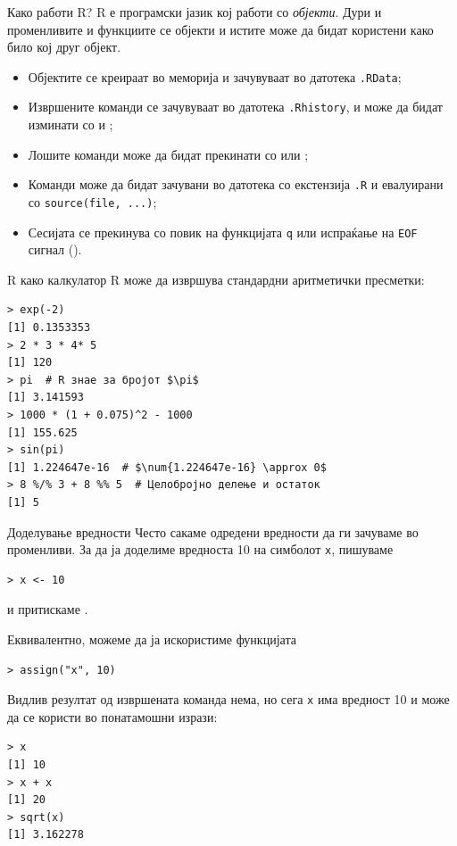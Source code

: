 \documentclass[hyperref={unicode}, xcolor={svgnames, table},
usepdftitle=false]{beamer}
\theoremstyle{remark}
\begin{document}
\begin{frame}{Како работи R?}
  R е програмски јазик кој работи со \emph{објекти}.  Дури и променливите и
  функциите се објекти и истите може да бидат користени како било кој друг
  објект.
  \begin{itemize}
  \item Објектите се креираат во меморија и зачувуваат во датотека
    \texttt{.RData};
  \item Извршените команди се зачувуваат во датотека \texttt{.Rhistory}, и може
    да бидат изминати со \keys{\arrowkeyup} и \keys{\arrowkeydown};
  \item Лошите команди може да бидат прекинати со \keys{\esc} или
    ;
  \item Команди може да бидат зачувани во датотека со екстензија \texttt{.R} и
    евалуирани со \texttt{source(file, ...)};
  \item Сесијата се прекинува со повик на функцијата \texttt{q} или
    испраќање на \texttt{EOF} сигнал ().
  \end{itemize}
\end{frame}

\begin{frame}[fragile]{R како калкулатор}
  R може да извршува стандардни аритметички пресметки:
\begin{verbatim}
> exp(-2)
[1] 0.1353353
> 2 * 3 * 4* 5
[1] 120
> pi  # R знае за бројот $\pi$
[1] 3.141593
> 1000 * (1 + 0.075)^2 - 1000
[1] 155.625
> sin(pi)
[1] 1.224647e-16  # $\num{1.224647e-16} \approx 0$
> 8 %/% 3 + 8 %% 5  # Целобројно делење и остаток
[1] 5
\end{verbatim}
\end{frame}

\begin{frame}[fragile]{Доделување вредности}
  Често сакаме одредени вредности да ги зачуваме во променливи.  За да ја
  доделиме вредноста \num{10} на симболот \texttt{x}, пишуваме
\begin{verbatim}
> x <- 10
\end{verbatim}
  и притискаме \keys{\return}.

  Еквивалентно, можеме да ја искористиме функцијата
\begin{verbatim}
> assign("x", 10)
\end{verbatim}

  Видлив резултат од извршената команда нема, но сега \texttt{x} има
  вредност \num{10} и може да се користи во понатамошни изрази:
\begin{verbatim}
> x
[1] 10
> x + x
[1] 20
> sqrt(x)
[1] 3.162278
\end{verbatim}
\end{frame}
\end{document}
